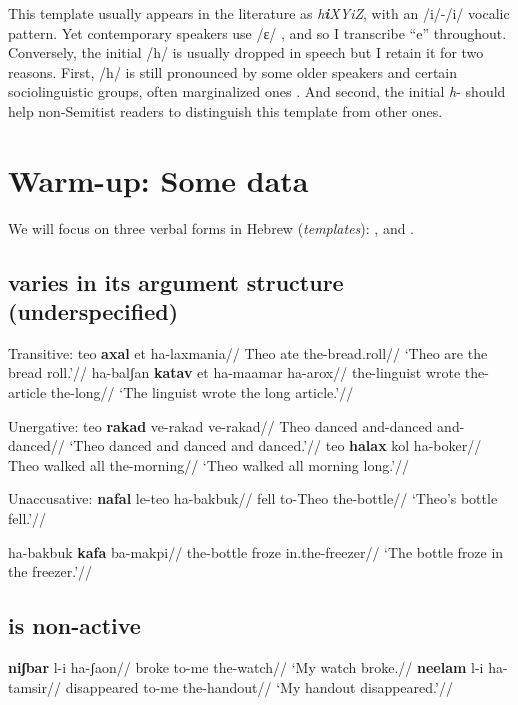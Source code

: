 This template usually appears in the literature as \emph{h\textbf{i}XYiZ}, with an /i/-/i/ vocalic pattern. Yet contemporary speakers use /ɛ/ \citep{trachtman16}, and so I transcribe ``e'' throughout. Conversely, the initial /h/ is usually dropped in speech but I retain it for two reasons. First, /h/ is still pronounced by some older speakers and certain sociolinguistic groups, often marginalized ones \citep[cf.~][]{schwarzwald81biu,gafter14phd}. And second, the initial \emph{h}- should help non-Semitist readers to distinguish this template from other ones.

\section{Warm-up: Some data}
We will focus on three verbal forms in Hebrew (\emph{templates}): {\tkal}, {\tnif} and {\thif}.

	\subsection{{\tkal} varies in its argument structure (underspecified)}
\pex Transitive:
	\a \begingl
		\gla teo \textbf{axal} et ha-laxmania//
		\glb Theo ate  the-bread.roll//
		\glft `Theo are the bread roll.'//
	\endgl
	\a \begingl
		\gla ha-balʃan \textbf{katav} et ha-maamar ha-arox//
		\glb the-linguist wrote  the-article the-long//
		\glft `The linguist wrote the long article.'//
	\endgl
\xe

\pex Unergative:
	\a \begingl
		\gla teo \textbf{rakad} ve-rakad ve-rakad//
		\glb Theo danced and-danced and-danced//
		\glft `Theo danced and danced and danced.'//
	\endgl
	\a \begingl
		\gla teo \textbf{halax} kol ha-boker//
		\glb Theo walked all the-morning//
		\glft `Theo walked all morning long.'//
	\endgl
\xe

\pex Unaccusative:
	\a \begingl
		\gla \textbf{nafal} le-teo ha-bakbuk//
		\glb fell to-Theo the-bottle//
		\glft `Theo's bottle fell.'//
	\endgl
	
	\a \begingl
		\gla ha-bakbuk \textbf{kafa} ba-makpi//
		\glb the-bottle froze in.the-freezer//
		\glft `The bottle froze in the freezer.'//
	\endgl
\xe


	\subsection{{\tnif} is non-active}
\pex
	\a \begingl
		\gla \textbf{niʃbar} l-i ha-ʃaon//
		\glb broke to-me the-watch//
		\glft `My watch broke.//
	\endgl
	\a \begingl
		\gla \textbf{neelam} l-i ha-tamsir//
		\glb disappeared to-me the-handout//
		\glft `My handout disappeared.'//
	\endgl
\xe

